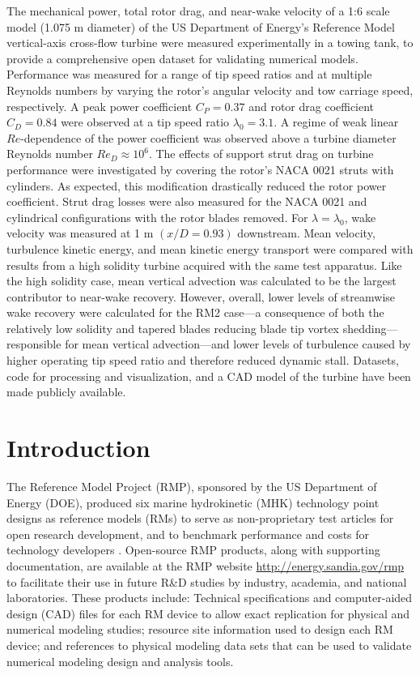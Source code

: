 \documentclass[10pt,letterpaper]{article}
\begin{document}
The mechanical power, total rotor drag, and near-wake velocity of a 1:6 scale
model (1.075 m diameter) of the US Department of Energy's Reference Model
vertical-axis cross-flow turbine were measured experimentally in a towing tank,
to provide a comprehensive open dataset for validating numerical models.
Performance was measured for a range of tip speed ratios and at multiple
Reynolds numbers by varying the rotor's angular velocity and tow carriage speed,
respectively. A peak power coefficient $C_P = 0.37$ and rotor drag coefficient
$C_D = 0.84$ were observed at a tip speed ratio $\lambda_0 = 3.1$. A regime of
weak linear $Re$-dependence of the power coefficient was observed above a
turbine diameter Reynolds number $Re_D \approx 10^6$. The effects of support
strut drag on turbine performance were investigated by covering the rotor's NACA
0021 struts with cylinders. As expected, this modification drastically reduced
the rotor power coefficient. Strut drag losses were also measured for the NACA
0021 and cylindrical configurations with the rotor blades removed. For
$\lambda=\lambda_0$, wake velocity was measured at 1 m $(x/D=0.93)$ downstream.
Mean velocity, turbulence kinetic energy, and mean kinetic energy transport were
compared with results from a high solidity turbine acquired with the same test
apparatus. Like the high solidity case, mean vertical advection was calculated
to be the largest contributor to near-wake recovery. However, overall, lower
levels of streamwise wake recovery were calculated for the RM2 case---a
consequence of both the relatively low solidity and tapered blades reducing
blade tip vortex shedding---responsible for mean vertical advection---and lower
levels of turbulence caused by higher operating tip speed ratio and therefore
reduced dynamic stall. Datasets, code for processing and visualization, and a
CAD model of the turbine have been made publicly available.


\section*{Introduction}

The Reference Model Project (RMP), sponsored by the US Department of Energy
(DOE), produced six marine hydrokinetic (MHK) technology point designs as
reference models (RMs) to serve as non-proprietary test articles for open
research development, and to benchmark performance and costs for technology
developers \cite{Neary2014, Neary2014a}. Open-source RMP products, along with
supporting documentation, are available at the RMP website
\url{http://energy.sandia.gov/rmp} to facilitate their use in future R\&D
studies by industry, academia, and national laboratories. These products
include: Technical specifications and computer-aided design (CAD) files for each
RM device to allow exact replication for physical and numerical modeling
studies; resource site information used to design each RM device; and references
to physical modeling data sets that can be used to validate numerical modeling
design and analysis tools.
\end{document}
